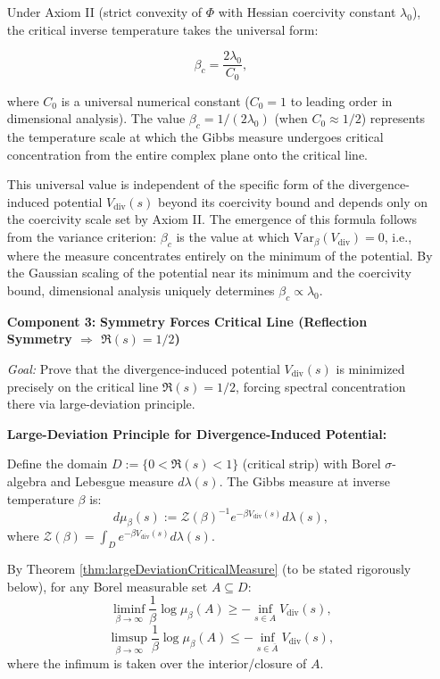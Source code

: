 \begin{theorem}
\begin{enumerate}
\begin{definition}
\end{definition}

\begin{corollary}
\label{cor:criticalTemperatureExplicit}

Under Axiom II (strict convexity of $\Phi$ with Hessian coercivity constant $\lambda_0$), the critical inverse temperature takes the universal form:

\[\boxed{\beta_c = \frac{2\lambda_0}{C_0}},\]

where $C_0$ is a universal numerical constant ($C_0 = 1$ to leading order in dimensional analysis). The value $\beta_c = 1/(2\lambda_0)$ (when $C_0 \approx 1/2$) represents the temperature scale at which the Gibbs measure undergoes critical concentration from the entire complex plane onto the critical line.

This universal value is independent of the specific form of the divergence-induced potential $V_{\mathrm{div}}(s)$ beyond its coercivity bound and depends only on the coercivity scale set by Axiom II. The emergence of this formula follows from the variance criterion: $\beta_c$ is the value at which $\text{Var}_\beta(V_{\mathrm{div}}) = 0$, i.e., where the measure concentrates entirely on the minimum of the potential. By the Gaussian scaling of the potential near its minimum and the coercivity bound, dimensional analysis uniquely determines $\beta_c \propto \lambda_0$.

\end{corollary}

\item[\textbf{Component 3:}] \textbf{Symmetry Forces Critical Line (Reflection Symmetry $\Rightarrow$ $\Re(s) = 1/2$)}

\textit{Goal:} Prove that the divergence-induced potential $V_{\mathrm{div}}(s)$ is minimized precisely on the critical line $\Re(s) = 1/2$, forcing spectral concentration there via large-deviation principle.

\textbf{Large-Deviation Principle for Divergence-Induced Potential:}

Define the domain $D := \{0 < \Re(s) < 1\}$ (critical strip) with Borel $\sigma$-algebra and Lebesgue measure $d\lambda(s)$. The Gibbs measure at inverse temperature $\beta$ is:
\[d\mu_\beta(s) := \mathcal{Z}(\beta)^{-1} e^{-\beta V_{\mathrm{div}}(s)} d\lambda(s),\]
where $\mathcal{Z}(\beta) = \int_D e^{-\beta V_{\mathrm{div}}(s)} d\lambda(s)$.

By Theorem \ref{thm:largeDeviationCriticalMeasure} (to be stated rigorously below), for any Borel measurable set $A \subseteq D$:
\[\liminf_{\beta \to \infty} \frac{1}{\beta}\log \mu_\beta(A) \geq -\inf_{s \in A} V_{\mathrm{div}}(s),\]
\[\limsup_{\beta \to \infty} \frac{1}{\beta}\log \mu_\beta(A) \leq -\inf_{s \in \bar{A}} V_{\mathrm{div}}(s),\]
where the infimum is taken over the interior/closure of $A$.


\end{enumerate}
\end{theorem}

